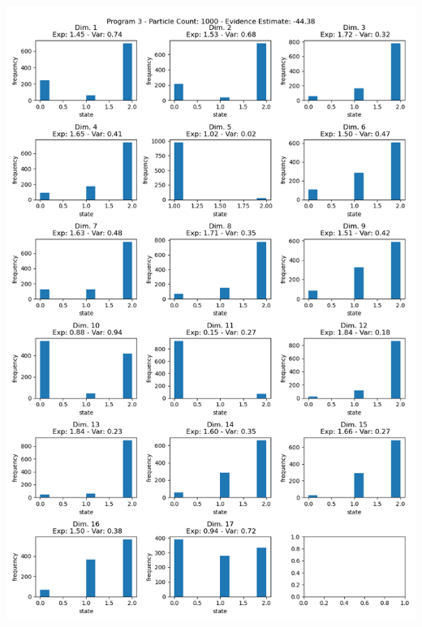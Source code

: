 \documentclass[10pt]{homeworg}
\begin{document}
\begin{center}
\includegraphics[scale=0.5]{figures/program3/1000_particles.png}
\end{center}
\end{document}

